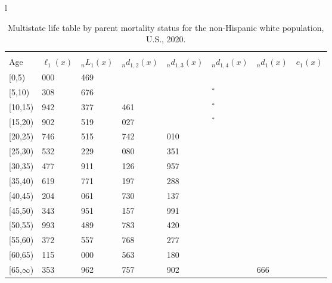 \documentclass[
]{article}
\begin{document}
\begin{table}
\caption{\label{tab:table-nhwhite}Multistate life table by parent mortality status for the non-Hispanic white population, U.S., 2020.}

\centering
\fontsize{9}{11}\selectfont
\begin{tabular}[t]{l}
\hline
\begin{tabular}{>{\raggedright\arraybackslash}p{.45in}>{\raggedleft\arraybackslash}p{.65in}>{\raggedleft\arraybackslash}p{.65in}>{\raggedleft\arraybackslash}p{.65in}>{\raggedleft\arraybackslash}p{.65in}>{\raggedleft\arraybackslash}p{.65in}>{\raggedleft\arraybackslash}p{.65in}>{\raggedleft\arraybackslash}p{.65in}}
\toprule
\multicolumn{1}{c}{ } & \multicolumn{7}{c}{(1) Lost neither} \\
\cmidrule(l{3pt}r{3pt}){2-8}
Age & $\ell_{1}(x)$ & ${}_nL_{1}(x)$ & ${}_nd_{1,2}(x)$ & ${}_nd_{1,3}(x)$ & ${}_nd_{1,4}(x)$ & ${}_nd_{1}(x)$ & $e_{1}(x)$\\
\midrule
{}[0,5) & 100 000 & 495 469 & 771 & 357 & 46 & 518 & 44\\
{}[5,10) & 98 308 & 488 676 & 915 & 396 & 6$^{*}$ & 48 & 39\\
{}[10,15) & 96 942 & 480 377 & 1 461 & 490 & 16$^{*}$ & 73 & 34\\
{}[15,20) & 94 902 & 467 519 & 2 027 & 880 & 19$^{*}$ & 230 & 29\\
{}[20,25) & 91 746 & 447 515 & 2 742 & 1 010 & 42 & 421 & 25\\
\addlinespace
{}[25,30) & 87 532 & 422 229 & 3 080 & 1 351 & 55 & 569 & 20\\
{}[30,35) & 82 477 & 388 911 & 4 126 & 1 957 & 77 & 699 & 16\\
{}[35,40) & 75 619 & 346 771 & 5 197 & 2 288 & 157 & 772 & 12\\
{}[40,45) & 67 204 & 291 061 & 6 730 & 3 137 & 195 & 799 & 9\\
{}[45,50) & 56 343 & 227 951 & 7 157 & 2 991 & 353 & 847 & 6\\
\addlinespace
{}[50,55) & 44 993 & 158 489 & 7 783 & 3 420 & 563 & 855 & 4\\
{}[55,60) & 32 372 & 94 557 & 6 768 & 3 277 & 447 & 765 & 2\\
{}[60,65) & 21 115 & 42 000 & 4 563 & 2 180 & 526 & 493 & 1\\
{}[65,$\infty$) & 13 353 & 30 962 & 3 757 & 1 902 & 893 & 1 666 & 0\\
\end{tabular}\\
\end{tabular}

\end{table}
\end{document}
